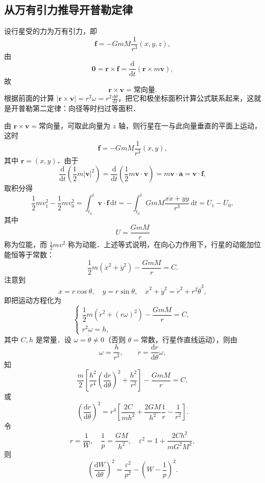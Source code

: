 \subsection{从万有引力推导开普勒定律}

设行星受的力为万有引力，即
\[
\boldsymbol{f} = -G m M \frac{1}{r^3}(x,y,z),
\]
由
\[
\boldsymbol{0} = \boldsymbol{r}\times\boldsymbol{f} = \frac{\mathrm{d}}{\mathrm{d}t}(\boldsymbol{r}\times m\boldsymbol{v}),
\]
故
\[
\boldsymbol{r}\times\boldsymbol{v} = \text{常向量}.
\]
根据前面的计算 $|\boldsymbol{r}\times\boldsymbol{v}| = r^2\omega = r^2\frac{\mathrm{d}\theta}{\mathrm{d}t}$，把它和极坐标面积计算公式联系起来，这就是开普勒第二定律：向径等时扫过等面积．

由 $\boldsymbol{r}\times\boldsymbol{v} = \text{常向量}$，可取此向量为 $z$ 轴，则行星在一与此向量垂直的平面上运动，这时
\[
\boldsymbol{f} = -G m M \frac{1}{r^3}(x,y),
\]
其中 $\boldsymbol{r} = (x,y)$．由于
\[
\frac{\mathrm{d}}{\mathrm{d}t}\left(\frac{1}{2}m|\boldsymbol{v}|^2\right) = \frac{\mathrm{d}}{\mathrm{d}t}\left(\frac{1}{2}m\boldsymbol{v}\cdot\boldsymbol{v}\right) = m\boldsymbol{v}\cdot\boldsymbol{a} = \boldsymbol{v}\cdot\boldsymbol{f},
\]
取积分得
\[
\frac{1}{2}m v_1^2 - \frac{1}{2}m v_0^2 = \int_{t_0}^t \boldsymbol{v}\cdot\boldsymbol{f}\,\mathrm{d}t = -\int_{t_0}^t G m M \frac{x\dot{x} + y\dot{y}}{r^3}\,\mathrm{d}t = U_1 - U_0,
\]
其中
\[
U = \frac{G m M}{r}
\]
称为位能，而 $\frac{1}{2}m v^2$ 称为动能．上述等式说明，在向心力作用下，行星的动能加位能恒等于常数：
\[
\frac{1}{2}m(\dot{x}^2 + \dot{y}^2) - \frac{G m M}{r} = C.
\]
注意到
\[
x = r\cos\theta,\quad y = r\sin\theta,\quad \dot{x}^2 + \dot{y}^2 = \dot{r}^2 + r^2\dot{\theta}^2,
\]
即把运动方程化为
\[
\begin{cases}
\dfrac{1}{2}m\left(\dot{r}^2 + (r\omega)^2\right) - \dfrac{G m M}{r} = C,\\[8pt]
r^2\omega = h,
\end{cases}
\]
其中 $C, h$ 是常量．设 $\omega = \dot{\theta} \neq 0$（否则 $\theta = \text{常数}$，行星作直线运动），则由
\[
\omega = \frac{h}{r^2},\qquad \dot{r} = \frac{\mathrm{d}r}{\mathrm{d}\theta}\omega,
\]
知
\[
\frac{m}{2}\left[\frac{h^2}{r^4}\left(\frac{\mathrm{d}r}{\mathrm{d}\theta}\right)^2 + \frac{h^2}{r^2}\right] - \frac{G m M}{r} = C,
\]
或
\[
\left(\frac{\mathrm{d}r}{\mathrm{d}\theta}\right)^2 = r^4\left[\frac{2C}{m h^2} + \frac{2G M}{h^2}\frac{1}{r} - \frac{1}{r^2}\right].
\]
令
\[
r = \frac{1}{W},\quad \frac{1}{p} = \frac{G M}{h^2},\quad \varepsilon^2 = 1 + \frac{2C h^2}{m G^2 M^2},
\]
则
\[
\left(\frac{\mathrm{d}W}{\mathrm{d}\theta}\right)^2 = \frac{\varepsilon^2}{p^2} - \left(W - \frac{1}{p}\right)^2.
\]
